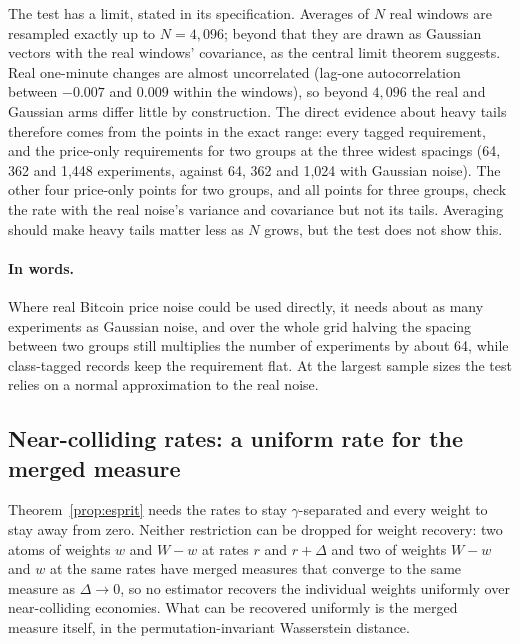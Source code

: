 \documentclass[12pt]{article}
\theoremstyle{definition}
\theoremstyle{remark}
\begin{document}
The test has a limit, stated in its specification. Averages of $N$ real windows are resampled exactly up to $N=4{,}096$; beyond that they are drawn as Gaussian vectors with the real windows' covariance, as the central limit theorem suggests. Real one-minute changes are almost uncorrelated (lag-one autocorrelation between $-0.007$ and $0.009$ within the windows), so beyond $4{,}096$ the real and Gaussian arms differ little by construction. The direct evidence about heavy tails therefore comes from the points in the exact range: every tagged requirement, and the price-only requirements for two groups at the three widest spacings (64, 362 and 1{,}448 experiments, against 64, 362 and 1{,}024 with Gaussian noise). The other four price-only points for two groups, and all points for three groups, check the rate with the real noise's variance and covariance but not its tails. Averaging should make heavy tails matter less as $N$ grows, but the test does not show this.

\paragraph{In words.} Where real Bitcoin price noise could be used directly, it needs about as many experiments as Gaussian noise, and over the whole grid halving the spacing between two groups still multiplies the number of experiments by about 64, while class-tagged records keep the requirement flat. At the largest sample sizes the test relies on a normal approximation to the real noise.

\subsection{Near-colliding rates: a uniform rate for the merged measure}\label{sec:uniform}

Theorem~\ref{prop:esprit} needs the rates to stay $\gamma$-separated and every weight to stay away from zero. Neither restriction can be dropped for weight recovery: two atoms of weights $w$ and $W-w$ at rates $r$ and $r+\Delta$ and two of weights $W-w$ and $w$ at the same rates have merged measures that converge to the same measure as $\Delta\to0$, so no estimator recovers the individual weights uniformly over near-colliding economies. What can be recovered uniformly is the merged measure itself, in the permutation-invariant Wasserstein distance.
\end{document}
